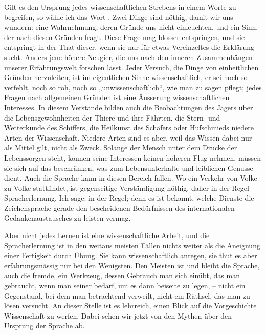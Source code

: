 Gilt es den Ursprung jedes wissenschaftlichen Strebens in einem Worte zu begreifen, so wähle ich das Wort . Zwei Dinge sind nöthig, damit wir uns wundern: eine Wahrnehmung, deren Gründe uns nicht einleuchten, und ein Sinn, der nach diesen Gründen fragt. Diese Frage mag blosser  entspringen, und sie entspringt in der That  dieser, wenn sie nur für etwas Vereinzeltes die Erklärung sucht. Anders jene höhere Neugier, die uns nach den inneren Zusammenhängen unserer Erfahrungswelt forschen lässt. Jeder \label{sp.18} Versuch, die Dinge von einheitlichen Gründen herzuleiten, ist im eigentlichen Sinne wissenschaftlich, er sei noch so verfehlt, noch so roh, noch so „unwissenschaftlich“, wie man zu sagen pflegt; jedes Fragen nach allgemeinen Gründen ist eine Äusserung wissenschaftlichen Interesses. In diesem Verstande bilden auch die Beobachtungen des Jägers über die Lebensgewohnheiten der Thiere und ihre Fährten, die Stern- und Wetterkunde des Schiffers, die Heilkunst des Schäfers oder Hufschmieds niedere Arten der Wissenschaft. Niedere Arten sind es aber, weil das Wissen dabei nur als Mittel gilt, nicht als Zweck. Solange der Mensch unter dem Drucke der Lebenssorgen steht, können seine Interessen keinen höheren Flug nehmen, müssen sie sich auf das beschränken, was zum Lebensunterhalte und leiblichen Genusse dient. Auch die Sprache kann in diesen Bereich fallen. Wo ein Verkehr von Volke zu Volke stattfindet, ist gegenseitige Verständigung nöthig, daher in der Regel Spracherlernung. Ich sage: in der Regel; denn es ist bekannt, welche Dienste die Zeichensprache gerade den bescheidenen Bedürfnissen des internationalen Gedankenaustausches zu leisten vermag.

Aber nicht jedes Lernen ist eine wissenschaftliche Arbeit, und die Spracherlernung ist in den weitaus meisten Fällen nichts weiter als die Aneignung einer Fertigkeit durch Übung. Sie kann wissenschaftlich anregen, sie thut es aber erfahrungsmässig nur bei den Wenigsten. Den Meisten ist und bleibt die Sprache, auch die fremde, ein Werkzeug, dessen Gebrauch man sich einübt, das man gebraucht, wenn man seiner bedarf, um es dann beiseite zu legen, – nicht ein Gegenstand, bei dem \label{fp.17} man betrachtend verweilt, nicht ein Räthsel, das man zu lösen versucht. An dieser Stelle ist es lehrreich, einen Blick auf die Vorgeschichte  Wissenschaft zu werfen. Dabei sehen wir jetzt von den Mythen über den Ursprung der Sprache ab.

